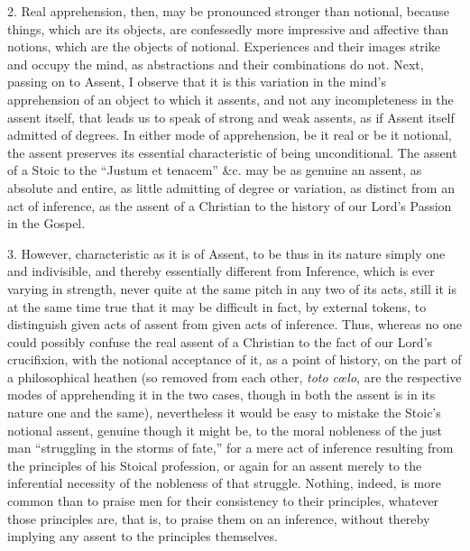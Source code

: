 2. Real apprehension, then, may be pronounced stronger than
notional, because things, which are its objects, are confessedly more
impressive and affective than notions, which are the objects of
notional. Experiences and their images strike and occupy the mind, as
abstractions and their combinations do not. Next, passing on to
Assent, I observe that it is this variation in the mind's apprehension
of an object to which it assents, and not any incompleteness in the
assent itself, that leads us to speak of strong and weak assents, as
if Assent itself admitted of degrees. In either mode of
apprehension, be it real or be it notional, the assent preserves its
essential characteristic of being unconditional. The assent of a Stoic
to the ``Justum et tenacem'' \&c. may be as genuine an
assent, as absolute and entire, as little admitting of degree or
variation, as distinct from an act of inference, as the assent of a
Christian to the history of our Lord's Passion in the Gospel.

3. However, characteristic as it is of Assent, to be thus in its
nature simply one and indivisible, and thereby essentially different
from Inference, which is ever varying in strength, never quite at the
same pitch in any two of its acts, still it is at the same time true
that it may be difficult in fact, by external tokens, to distinguish
given acts of assent from given acts of inference. Thus, whereas no
one could possibly confuse the real assent of a Christian to the fact
of our Lord's crucifixion, with the notional acceptance of it, as a
point of history, on the part of a philosophical heathen (so removed
from each other, \emph{toto cœlo}, are the respective modes of
apprehending it in the two cases, though in both the assent is in its
nature one and the same), nevertheless it would be easy to mistake the
Stoic's notional assent, genuine though it might be, to the moral
nobleness of the just man ``struggling in the storms of
fate,'' for a mere act of inference resulting from the principles
of his Stoical profession, or again for an assent merely to the
inferential necessity of the nobleness of that struggle. Nothing,
indeed, is more common than to praise men for their consistency to
their principles, whatever those principles are, that is, to
praise them on an inference, without thereby implying any assent to
the principles themselves.

